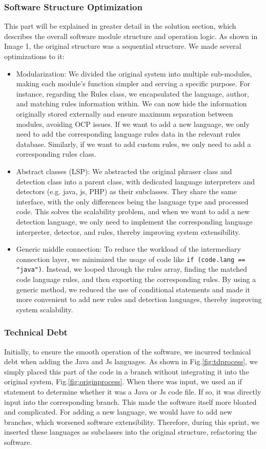 \subsubsection{Software Structure Optimization}
This part will be explained in greater detail in the solution section, which describes the overall software module structure and operation logic. As shown in Image 1, the original structure was a sequential structure. We made several optimizations to it:
\begin{itemize}
\item Modularization: We divided the original system into multiple sub-modules, making each module's function simpler and serving a specific purpose. For instance, regarding the Rules class, we encapsulated the language, author, and matching rules information within. We can now hide the information originally stored externally and ensure maximum separation between modules, avoiding OCP issues. If we want to add a new language, we only need to add the corresponding language rules data in the relevant rules database. Similarly, if we want to add custom rules, we only need to add a corresponding rules class.
\item Abstract classes (LSP): We abstracted the original phraser class and detection class into a parent class, with dedicated language interpreters and detectors (e.g. java, js, PHP) as their subclasses. They share the same interface, with the only differences being the language type and processed code. This solves the scalability problem, and when we want to add a new detection language, we only need to implement the corresponding language interpreter, detector, and rules, thereby improving system extensibility.
\item Generic middle connection: To reduce the workload of the intermediary connection layer, we minimized the usage of code like \verb|if (code.lang == "java")|. Instead, we looped through the rules array, finding the matched code language rules, and then exporting the corresponding rules. By using a generic method, we reduced the use of conditional statements and made it more convenient to add new rules and detection languages, thereby improving system scalability.
\end{itemize}

\subsubsection{Technical Debt}
Initially, to ensure the smooth operation of the software, we incurred technical debt when adding the Java and Js languages. As shown in Fig.\ref{fig:tdprocess}, we simply placed this part of the code in a branch without integrating it into the original system, Fig.\ref{fig:originprocess}. When there was input, we used an if statement to determine whether it was a Java or Js code file. If so, it was directly input into the corresponding branch. This made the software itself more bloated and complicated. For adding a new language, we would have to add new branches, which worsened software extensibility. Therefore, during this sprint, we inserted these languages as subclasses into the original structure, refactoring the software.

